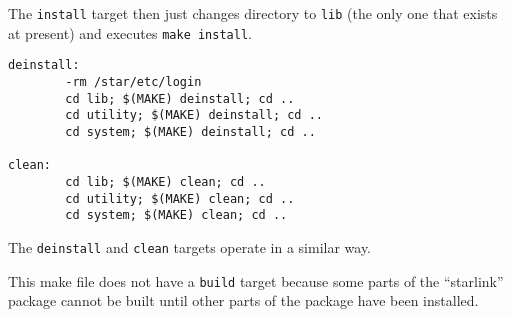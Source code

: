 The {\tt install} target then just changes directory to {\tt lib} (the only 
one that exists at present) and executes {\tt make install}.

\begin{verbatim}
deinstall:
        -rm /star/etc/login
        cd lib; $(MAKE) deinstall; cd ..
        cd utility; $(MAKE) deinstall; cd ..
        cd system; $(MAKE) deinstall; cd ..
 
clean:
        cd lib; $(MAKE) clean; cd ..
        cd utility; $(MAKE) clean; cd ..
        cd system; $(MAKE) clean; cd ..
\end{verbatim}
The {\tt deinstall} and {\tt clean} targets operate in a similar way.

This make file does not have a {\tt build} target because some parts of the
``starlink'' package cannot be built until other parts of the package have
been installed.
